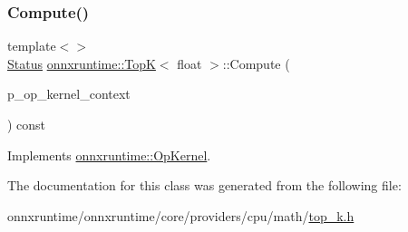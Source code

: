\subsubsection{\texorpdfstring{Compute()}{Compute()}\hspace{0.1cm}{\footnotesize\ttfamily [2/2]}}
{\footnotesize\ttfamily template$<$$>$ \\
\mbox{\hyperlink{classonnxruntime_1_1common_1_1Status}{Status}} \mbox{\hyperlink{classonnxruntime_1_1TopK}{onnxruntime\+::\+TopK}}$<$ float $>$\+::Compute (\begin{DoxyParamCaption}\item[{\mbox{\hyperlink{classonnxruntime_1_1OpKernelContext}{Op\+Kernel\+Context}} $\ast$}]{p\+\_\+op\+\_\+kernel\+\_\+context }\end{DoxyParamCaption}) const\hspace{0.3cm}{\ttfamily [virtual]}}



Implements \mbox{\hyperlink{classonnxruntime_1_1OpKernel_a9eca8656a78b1b3ab9d3351a12798650}{onnxruntime\+::\+Op\+Kernel}}.



The documentation for this class was generated from the following file\+:\begin{DoxyCompactItemize}
\item 
onnxruntime/onnxruntime/core/providers/cpu/math/\mbox{\hyperlink{top__k_8h}{top\+\_\+k.\+h}}\end{DoxyCompactItemize}
